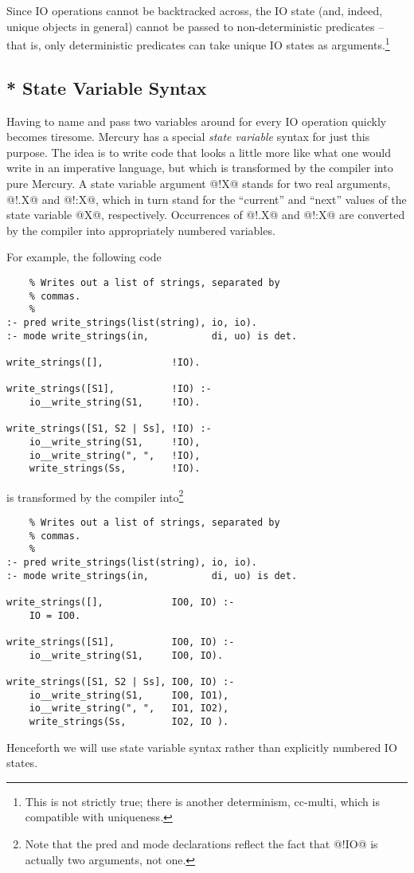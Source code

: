 \documentclass[a4paper,11pt,notitlepage,onecolumn]{article}
\begin{document}
Since IO operations cannot be backtracked across, the IO state
(and, indeed, unique objects in general) cannot be passed to
non-deterministic predicates -- that is, only deterministic
predicates can take unique IO states as arguments.\footnote{This is not strictly true; there is another
determinism, cc-multi, which is compatible with uniqueness.}

\subsection{* State Variable Syntax}

Having to name and pass two variables around for every IO
operation quickly becomes tiresome.  Mercury has a special
\emph{state variable} syntax for just this purpose.  The idea is to
write code that looks a little more like what one would write
in an imperative language, but which is transformed by the
compiler into pure Mercury.  A state variable argument @!X@
stands for two real arguments, @!.X@ and @!:X@, which in turn
stand for the ``current'' and ``next'' values of the state variable
@X@, respectively.  Occurrences of @!.X@ and @!:X@ are converted by
the compiler into appropriately numbered variables.

For example, the following code
\begin{verbatim}
    % Writes out a list of strings, separated by
    % commas.
    %
:- pred write_strings(list(string), io, io).
:- mode write_strings(in,           di, uo) is det.

write_strings([],            !IO).

write_strings([S1],          !IO) :-
    io__write_string(S1,     !IO).

write_strings([S1, S2 | Ss], !IO) :-
    io__write_string(S1,     !IO),
    io__write_string(", ",   !IO),
    write_strings(Ss,        !IO).
\end{verbatim}
is transformed by the compiler into\footnote{Note that the pred and mode declarations reflect
the fact that @!IO@ is actually two arguments, not one.}
\begin{verbatim}
    % Writes out a list of strings, separated by
    % commas.
    %
:- pred write_strings(list(string), io, io).
:- mode write_strings(in,           di, uo) is det.

write_strings([],            IO0, IO) :-
    IO = IO0.

write_strings([S1],          IO0, IO) :-
    io__write_string(S1,     IO0, IO).

write_strings([S1, S2 | Ss], IO0, IO) :-
    io__write_string(S1,     IO0, IO1),
    io__write_string(", ",   IO1, IO2),
    write_strings(Ss,        IO2, IO ).
\end{verbatim}
Henceforth we will use state variable syntax rather than
explicitly numbered IO states.
\end{document}
